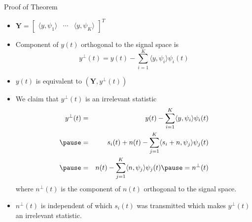 \documentclass[t]{beamer}
\begin{document}
\begin{frame}{Proof of Theorem}
  \footnotesize
  \begin{itemize}
    \item $\mathbf{Y} = \begin{bmatrix} \langle y, \psi_1 \rangle & \cdots & \langle y, \psi_K \rangle \end{bmatrix}^T$
    \item \pause Component of $y(t)$ orthogonal to the signal space is
      \begin{equation*}
        y^{\perp}(t) = y(t) - \sum_{i=1}^K \langle y, \psi_i \rangle \psi_i(t)
      \end{equation*}
    \item \pause $y(t)$ is equivalent to $(\mathbf{Y}, y^{\perp}(t))$
    \item \pause We claim that $y^\perp(t)$ is an irrelevant statistic \pause
      \begin{eqnarray*}
        y^{\perp}(t) & = & y(t) - \sum_{i=1}^K \langle y, \psi_i \rangle \psi_i(t)\\
                     \pause
                     & = & s_i(t) + n(t) - \sum_{j=1}^K\langle s_i+n, \psi_j \rangle \psi_j(t) \\
                     \pause
                     & = & n(t) - \sum_{j=1}^K\langle n,\psi_j\rangle \psi_j(t)  \pause = n^{\perp}(t)
      \end{eqnarray*}
      where $n^\perp(t)$ is the component of $n(t)$ orthogonal to the signal space.
    \item \pause $n^{\perp}(t)$ is independent of which $s_i(t)$ was transmitted which makes $y^\perp(t)$ an irrelevant statistic.
  \end{itemize}
  \normalsize
\end{frame}
\end{document}
